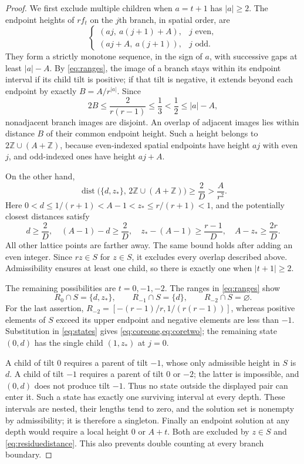 \documentclass[11pt]{article}
\theoremstyle{definition}
\theoremstyle{remark}
\newcommand{\Z}{\mathbb Z}
\newcommand{\dist}{\operatorname{dist}}
\begin{document}
\begin{proof}
We first exclude multiple children when $a=t+1$ has $|a|\ge2$.
The endpoint heights of $r f_t$ on the $j$th branch, in spatial order,
are
\[
 \begin{cases}(aj,\ a(j+1)+A),&j\text{ even},\\
 (aj+A,\ a(j+1)),&j\text{ odd}.
 \end{cases}
\]
They form a strictly monotone sequence, in the sign of $a$, with
successive gaps at least $|a|-A$. By \cref{eq:ranges}, the image of a
branch stays within its endpoint interval if its child tilt is positive;
if that tilt is negative, it extends beyond each endpoint by exactly
$B=A/r^{|a|}$. Since
\[
 2B\le\frac{2}{r(r-1)}\le\frac13<\frac12\le |a|-A,
\]
nonadjacent branch images are disjoint. An overlap of adjacent images
lies within distance $B$ of their common endpoint height. Such a height
belongs to $2\Z\cup(A+\Z)$, because even-indexed spatial endpoints
have height $aj$ with even $j$, and odd-indexed ones have height $aj+A$.

On the other hand,
\begin{equation}\label{eq:residuedistance}
 \dist\bigl(\{d,z_*\},\,2\Z\cup(A+\Z)\bigr)
 \ge\frac2D>\frac{A}{r^2}.
\end{equation}
Here $0<d\le1/(r+1)<A-1<z_*\le r/(r+1)<1$,
and the potentially closest distances satisfy
\[
 d\ge\frac2D,\quad (A-1)-d\ge\frac2D,\quad
 z_*-(A-1)\ge\frac{r-1}{D},\quad A-z_*\ge\frac{2r}{D}.
\]
All other lattice points are farther away. The same bound holds after
adding an even integer. Since $rz\in S$ for $z\in S$, it excludes every
overlap described above. Admissibility ensures at least one child, so
there is exactly one when $|t+1|\ge2$.

The remaining possibilities are $t=0,-1,-2$.
The ranges in \cref{eq:ranges} show
\[
 R_0\cap S=\{d,z_*\},\qquad R_{-1}\cap S=\{d\},\qquad
 R_{-2}\cap S=\varnothing.
\]
For the last assertion, $R_{-2}=[-(r-1)/r,1/(r(r-1))]$,
whereas positive elements of $S$ exceed its upper endpoint and negative
elements are less than $-1$.
Substitution in \cref{eq:states} gives \cref{eq:coreone,eq:coretwo};
the remaining state $(0,d)$ has the single child $(1,z_*)$ at $j=0$.

A child of tilt $0$ requires a parent of tilt $-1$, whose only admissible
height in $S$ is $d$. A child of tilt $-1$ requires a parent of tilt $0$
or $-2$; the latter is impossible, and $(0,d)$ does not produce tilt $-1$.
Thus no state outside the displayed pair can enter it. Such a state has
exactly one surviving interval at every depth. These intervals are
nested, their lengths tend to zero, and the solution set is nonempty
by admissibility; it is therefore a singleton.
Finally an endpoint solution at any depth would require a local height
$0$ or $A+t$. Both are excluded by $z\in S$ and
\cref{eq:residuedistance}. This also prevents double counting at every
branch boundary.
\end{proof}
\end{document}
